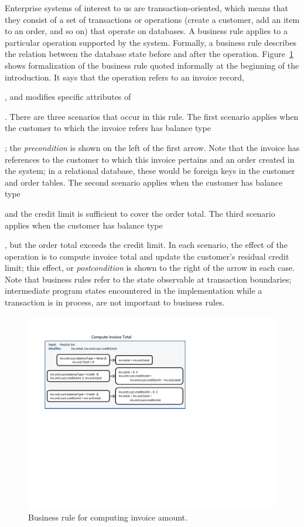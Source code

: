 Enterprise systems of interest to us are transaction-oriented, which means that
they consist of a set of transactions or operations (\eg create a customer, add
an item to an order, and so on) that operate on databases.  A business rule
applies to a particular operation supported by the system.  Formally, a business
rule describes the relation between the database state before and after the
operation.  Figure~\ref{fig:invoice} shows formalization of the business rule
quoted informally at the beginning of the introduction.  It says that the
operation refers to an invoice record, \subject{inv}, and modifies specific
attributes of \subject{inv}.  There are three scenarios that occur in this rule.
The first scenario applies when the customer to which the invoice refers has
balance type \subject{None}; the \textit{precondition} is shown on the left of
the first arrow.  Note that the invoice has references to the customer to which
this invoice pertains and an order created in the system; in a relational
database, these would be foreign keys in the customer and order tables.  The
second scenario applies when the customer has balance type \subject{Credit} and
the credit limit is sufficient to cover the order total.  The third scenario
applies when the customer has balance type \subject{Credit}, but the order total
exceeds the credit limit.  In each scenario, the effect of the operation is to
compute invoice total and update the customer's residual credit limit; this
effect, or \textit{postcondition} is shown to the right of the arrow in each
case.  Note that business rules refer to the state observable at transaction
boundaries; intermediate program states encountered in the implementation while
a transaction is in process, are not important to business rules.

\begin{figure}
\centering
\includegraphics[trim=55 320 286 54,clip,width=\columnwidth]{figs/invoice}
\vspace*{-14pt}
\caption{Business rule for computing invoice amount.}
\label{fig:invoice}
\end{figure}

